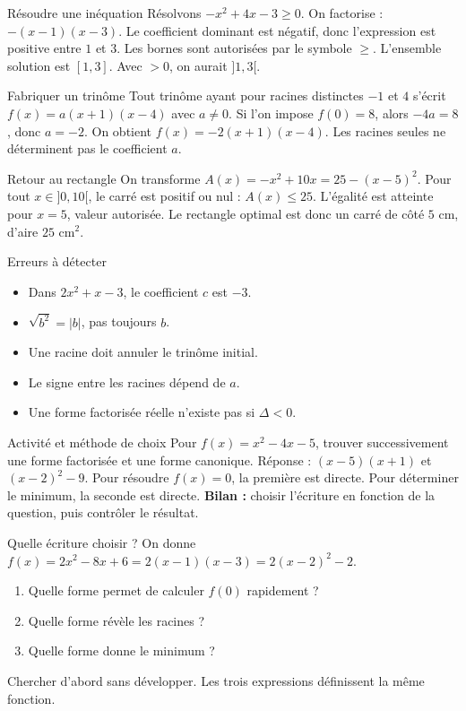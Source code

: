 \documentclass[aspectratio=169,12pt]{beamer}
\begin{document}
\renewcommand{\slidekind}{MÉTHODE \& EXEMPLE}
\begin{frame}[t,fragile]{Résoudre une inéquation}
Résolvons $-x^2+4x-3\ge0$. On factorise : $-(x-1)(x-3)$. Le coefficient dominant est négatif, donc l’expression est positive entre $1$ et $3$. Les bornes sont autorisées par le symbole $\ge$. L’ensemble solution est $[1,3]$. Avec $>0$, on aurait $]1,3[$.
\end{frame}
\renewcommand{\slidekind}{COMPRENDRE}
\begin{frame}[t,fragile]{Fabriquer un trinôme}
Tout trinôme ayant pour racines distinctes $-1$ et $4$ s’écrit $f(x)=a(x+1)(x-4)$ avec $a\ne0$. Si l’on impose $f(0)=8$, alors $-4a=8$, donc $a=-2$. On obtient $f(x)=-2(x+1)(x-4)$. Les racines seules ne déterminent pas le coefficient $a$.
\end{frame}
\renewcommand{\slidekind}{COMPRENDRE}
\begin{frame}[t,fragile]{Retour au rectangle}
On transforme $A(x)=-x^2+10x=25-(x-5)^2$. Pour tout $x\in]0,10[$, le carré est positif ou nul : $A(x)\le25$. L’égalité est atteinte pour $x=5$, valeur autorisée. Le rectangle optimal est donc un carré de côté $5$ cm, d’aire $25$ cm$^2$.
\end{frame}
\renewcommand{\slidekind}{À RETENIR}
\begin{frame}[t,fragile]{Erreurs à détecter}
\begin{itemize}\item Dans $2x^2+x-3$, le coefficient $c$ est $-3$.\item $\sqrt{b^2}=|b|$, pas toujours $b$.\item Une racine doit annuler le trinôme initial.\item Le signe entre les racines dépend de $a$.\item Une forme factorisée réelle n’existe pas si $\Delta<0$.\end{itemize}
\end{frame}
\renewcommand{\slidekind}{MÉTHODE \& EXEMPLE}
\begin{frame}[t,fragile]{Activité et méthode de choix}
Pour $f(x)=x^2-4x-5$, trouver successivement une forme factorisée et une forme canonique. \medskip Réponse : $(x-5)(x+1)$ et $(x-2)^2-9$. Pour résoudre $f(x)=0$, la première est directe. Pour déterminer le minimum, la seconde est directe. \textbf{Bilan :} choisir l’écriture en fonction de la question, puis contrôler le résultat.
\end{frame}
\renewcommand{\slidekind}{MÉTHODE \& EXEMPLE}
\begin{frame}[t,fragile]{Quelle écriture choisir ?}
On donne $f(x)=2x^2-8x+6=2(x-1)(x-3)=2(x-2)^2-2$.\begin{enumerate}\item Quelle forme permet de calculer $f(0)$ rapidement ?\item Quelle forme révèle les racines ?\item Quelle forme donne le minimum ?\end{enumerate}\medskip Chercher d’abord sans développer. Les trois expressions définissent la même fonction.
\end{frame}
\end{document}
